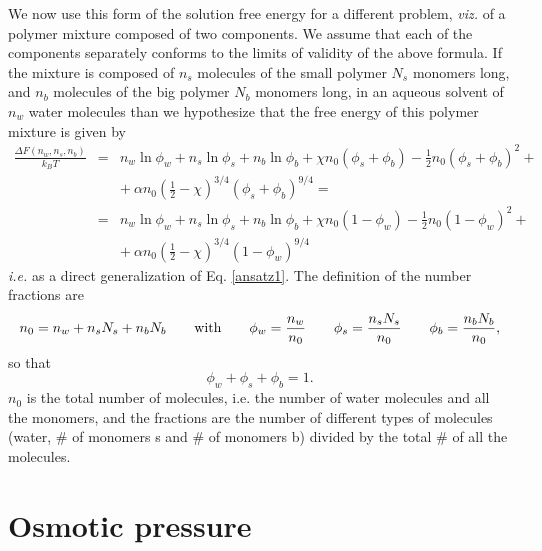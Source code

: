 \documentclass[11pt,a4paper]{article}
\begin{document}
We now use this form of the solution free energy for a different problem, {\sl viz.} of a polymer mixture composed of two components. We assume that each of the components separately conforms to the limits of validity of the above formula. If the mixture is composed of  $n_s$ molecules of the small polymer $N_s$ monomers long, and $n_b$ molecules of the big polymer $N_b$ monomers long, in an aqueous solvent of $n_w$ water molecules than we hypothesize that the free energy of this polymer mixture is given by 
\begin{eqnarray}
\frac{\Delta F(n_w, n_s, n_b)}{k_B T} &=& n_w  \ln{\phi_w} + n_s  \ln{\phi_s} + n_b  \ln{\phi_b} + \chi n_0 \left( \phi_s + \phi_b\right) - 
{\textstyle\frac12} n_0 \left( \phi_s + \phi_b \right)^{2} + \nonumber\\
& & + ~\alpha n_0 \left( {\textstyle\frac12} - \chi\right)^{3/4} \left( \phi_s + \phi_b \right)^{9/4} = \nonumber\\
&=& n_w  \ln{\phi_w} + n_s  \ln{\phi_s} + n_b  \ln{\phi_b} + \chi n_0 \left(1 - \phi_w\right) - 
{\textstyle\frac12} n_0 \left( 1 - \phi_w \right)^{2} + \nonumber\\
& & + ~\alpha n_0 \left( {\textstyle\frac12} - \chi\right)^{3/4} \left( 1 - \phi_w \right)^{9/4} 
\label{ansatz}
\end{eqnarray}
{\sl i.e.} as a direct generalization of Eq. \ref{ansatz1}. The definition of the number fractions are
\begin{equation}
n_0 = n_w + n_s N_s + n_b N_b \qquad {\rm with} \qquad \phi_w = \frac{n_w}{n_0} \qquad \phi_s = \frac{n_s N_s}{n_0} \qquad \phi_b = \frac{n_b N_b}{n_0},
\end{equation}
so that $$\phi_w + \phi_s + \phi_b = 1.$$$n_0$ is the total number of molecules, i.e. the number of water molecules and all the monomers, and the fractions are the number of different types of molecules (water, \# of monomers s and \# of monomers b) divided by the total \# of all the molecules. 

\section{Osmotic pressure}
\end{document}
